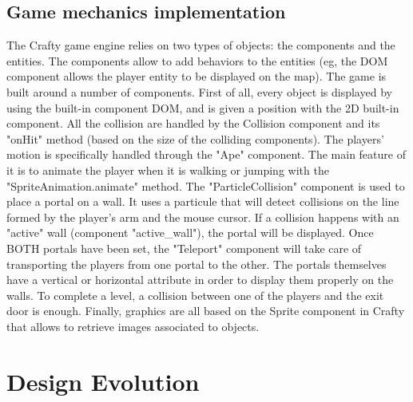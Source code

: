 \documentclass{chi-ext}
\begin{document}
\subsection{Game mechanics implementation}
The Crafty game engine relies on two types of objects: the components and the entities. The components allow to add behaviors to the entities (eg, the DOM component allows the player entity to be displayed on the map).
\newline
\newline
The game is built around a number of components.
\newline
First of all, every object is displayed by using the built-in component DOM, and is given a position with the 2D built-in component. All the collision are handled by the Collision component and its "onHit" method (based on the size of the colliding components).
\newline
The players' motion is specifically handled through the "Ape" component. The main feature of it is to animate the player when it is walking or jumping with the "SpriteAnimation.animate" method.
\newline
The "ParticleCollision" component is used to place a portal on a wall. It uses a particule that will detect collisions on the line formed by the player's arm and the mouse cursor. If a collision happens with an "active" wall (component "active\_wall"), the portal will be displayed. Once BOTH portals have been set, the "Teleport" component will take care of transporting the players from one portal to the other. The portals themselves have a vertical or horizontal attribute in order to display them properly on the walls.
\newline
To complete a level, a collision between one of the players and the exit door is enough.
\newline
Finally, graphics are all based on the Sprite component in Crafty that allows to retrieve images associated to objects.
\newline

\section{Design Evolution}
\end{document}
